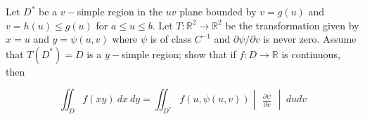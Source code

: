 Let $D^*$ be a $v-$simple region in the $uv$ plane bounded by $v = g(u)$ and $v = h(u) \leq g(u)$ for $a \leq u \leq b.$ Let $T:\mathbb{R}^2 \to \mathbb{R}^2$ be the transformation given by $x = u$ and $y = \psi (u, v)$ where $\psi$ is of class $C^{-1}$ and $\partial \psi / \partial v$ is never zero. Assume that $T(D^*) = D$ is a $y-$simple region; show that if $f: D \to \mathbb{R}$ is continuous, then

$$\iint_D f(x y) \ dx \ dy = \iint_{D^*} f(u, \psi(u, v)) \begin{vmatrix}
    \frac{\partial\psi}{\partial v}
\end{vmatrix} \ dudv$$
